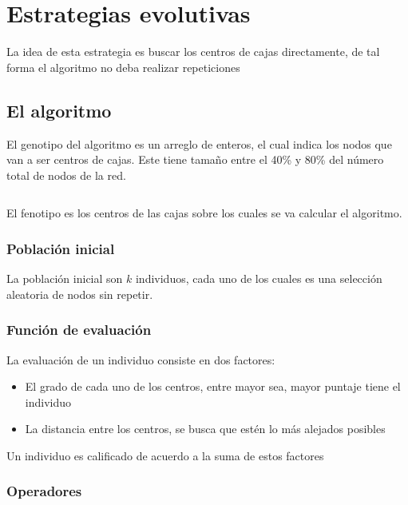 \section{Estrategias evolutivas}
\label{cap4:evolutivo}

La idea de esta estrategia es buscar los centros de cajas directamente, de tal forma el algoritmo no deba realizar repeticiones

\subsection{El algoritmo}

El genotipo del algoritmo es un arreglo de enteros, el cual indica los nodos que van a ser centros de cajas. Este tiene tamaño entre el 40\% y 80\% del número total de nodos de la red.

\begin{equation}
    [a_1,a_2,a_3,\cdots,a_n]
\end{equation}

El fenotipo es los centros de las cajas sobre los cuales se va calcular el algoritmo.

\subsubsection{Población inicial}

La población inicial son $k$ individuos, cada uno de los cuales es una selección aleatoria de nodos sin repetir.

\subsubsection{Función de evaluación}

La evaluación de un individuo consiste en dos factores:

\begin{itemize}
    \item El grado de cada uno de los centros, entre mayor sea, mayor puntaje tiene el individuo
    \item La distancia entre los centros, se busca que estén lo más alejados posibles
\end{itemize}

Un individuo es calificado de acuerdo a la suma de estos factores

\subsubsection{Operadores}


